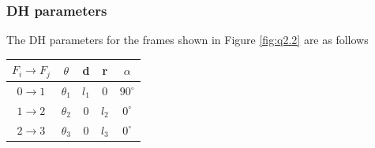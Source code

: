 \documentclass[12pt]{article}
\begin{document}
\subsubsection*{DH parameters}
The DH parameters for the frames shown in Figure \ref{fig:q2.2} are as follows
\begin{center}
\begin{tabular}{ c | c c c c }
 \hline
 $F_i \to F_j$ & $\theta$ & d & r & $\alpha$ \\
 \hline
 $0 \to 1$ & $\theta_1$ & $l_1$ & $ 0 $ & $90^{\circ}$ \\
 $1 \to 2$ & $\theta_2$ & 0     & $l_2$ & $0^{\circ}$ \\
 $2 \to 3$ & $\theta_3$ & 0     & $l_3$ & $0^{\circ}$ \\
 \hline
\end{tabular}
\end{center}
\end{document}
